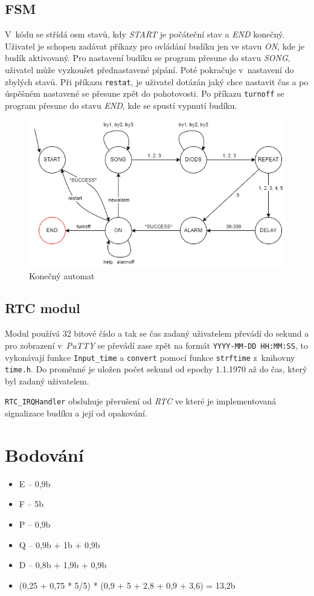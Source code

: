 \documentclass[11pt,a4paper]{article}
\begin{document}
\subsection{FSM}
V~kódu se střídá osm stavů, kdy \emph{START} je počáteční stav a \emph{END} konečný. Uživatel je schopen zadávat příkazy pro ovládání budíku jen ve stavu \emph{ON}, kde je budík aktivovaný. Pro nastavení budíku se program přesune do stavu \emph{SONG}, uživatel může vyzkoušet přednastavené pípání. Poté pokračuje v~nastavení do zbylých stavů. Při příkazu \verb|restat|, je uživatel dotázán jaký chce nastavit čas a po úspěšném nastavené se přesune zpět do pohotovosti. Po příkazu \verb|turnoff| se program přesune do stavu \emph{END}, kde se spustí vypnutí budíku.
\begin{figure}[!h]
    \centering
    \includegraphics[scale=0.6]{img/FSM.png}
    \caption{Konečný automat}
\end{figure}

\subsection{RTC modul}
Modul používá 32 bitové číslo a tak se čas zadaný uživatelem převádí do sekund a pro zobrazení v~\emph{PuTTY} se převádí zase zpět na formát \verb|YYYY-MM-DD HH:MM:SS|, to vykonávají funkce \verb|Input_time| a \verb|convert| pomocí funkce \verb|strftime| z~knihovny \verb|time.h|. Do proměnné je uložen počet sekund od epochy 1.1.1970 až do čas, který byl zadaný uživatelem.

\verb|RTC_IRQHandler| obsluhuje přerušení od \emph{RTC} ve které je implementovaná signalizace budíku a její od opakování.

\section{Bodování}
\begin{itemize}
        \item E -- 0,9b
        \item F -- 5b
        \item P -- 0,9b
        \item Q -- 0,9b + 1b + 0,9b
        \item D -- 0,8b + 1,9b + 0,9b
        \item (0,25 + 0,75 * 5/5) * (0,9 + 5 + 2,8 + 0,9 + 3,6) = 13,2b
    \end{itemize}
\end{document}
